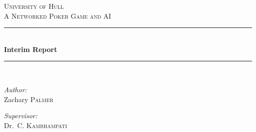 \begin{titlepage}

\newcommand{\HRule}{\rule{\linewidth}{0.5mm}} %

\center{} %
 

\textsc{\LARGE University of Hull}\\[1.5cm] %
\textsc{\Large A Networked Poker Game and AI}\\[0.5cm] %


\HRule\\[0.4cm]
{\huge \bfseries Interim Report}\\[0.4cm] %
\HRule\\[1.5cm]
 

\begin{minipage}{0.4\textwidth}
\begin{flushleft} \large
\emph{Author:}\\
Zachary \textsc{Palmer} %
\end{flushleft}
\end{minipage}
\begin{minipage}{0.4\textwidth}
\begin{flushright} \large
\emph{Supervisor:} \\
Dr.\ C. \textsc{Kambhampati} %
\end{flushright}
\end{minipage}\\[2cm]


\end{titlepage}
